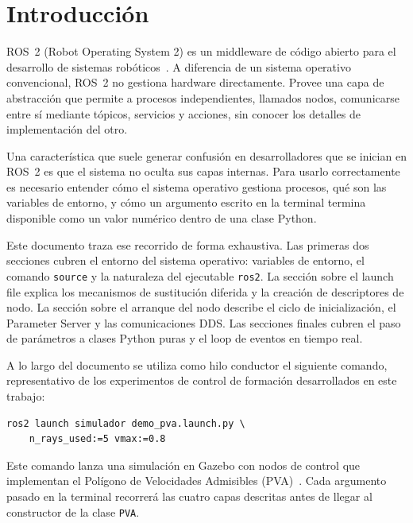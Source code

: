\section{Introducción}

ROS~2 (Robot Operating System 2) es un middleware de código abierto para el desarrollo de sistemas robóticos~\cite{macenski2022robot}. A diferencia de un sistema operativo convencional, ROS~2 no gestiona hardware directamente. Provee una capa de abstracción que permite a procesos independientes, llamados nodos, comunicarse entre sí mediante tópicos, servicios y acciones, sin conocer los detalles de implementación del otro.

Una característica que suele generar confusión en desarrolladores que se inician en ROS~2 es que el sistema no oculta sus capas internas. Para usarlo correctamente es necesario entender cómo el sistema operativo gestiona procesos, qué son las variables de entorno, y cómo un argumento escrito en la terminal termina disponible como un valor numérico dentro de una clase Python.

Este documento traza ese recorrido de forma exhaustiva. Las primeras dos secciones cubren el entorno del sistema operativo: variables de entorno, el comando \texttt{source} y la naturaleza del ejecutable \texttt{ros2}. La sección sobre el launch file explica los mecanismos de sustitución diferida y la creación de descriptores de nodo. La sección sobre el arranque del nodo describe el ciclo de inicialización, el Parameter Server y las comunicaciones DDS. Las secciones finales cubren el paso de parámetros a clases Python puras y el loop de eventos en tiempo real.

A lo largo del documento se utiliza como hilo conductor el siguiente comando, representativo de los experimentos de control de formación desarrollados en este trabajo:

\begin{lstlisting}[style=bash, caption={Comando de ejemplo utilizado a lo largo del documento.}, label={lst:cmd_ejemplo}]
ros2 launch simulador demo_pva.launch.py \
    n_rays_used:=5 vmax:=0.8
\end{lstlisting}

Este comando lanza una simulación en Gazebo con nodos de control que implementan el Polígono de Velocidades Admisibles (PVA)~\cite{ramirez2001collision}. Cada argumento pasado en la terminal recorrerá las cuatro capas descritas antes de llegar al constructor de la clase \texttt{PVA}.

